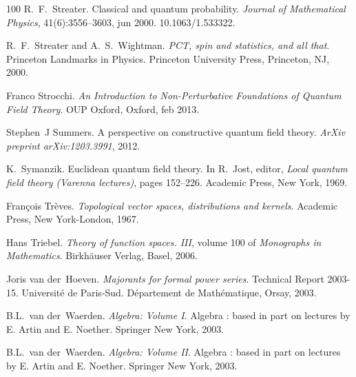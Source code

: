 \documentclass{article}
\newcommand{\tmtextit}[1]{{\itshape{#1}}}
\begin{document}
\begin{thebibliography}{100}
  R.~F.~Streater. {\newblock}Classical
  and quantum probability. {\newblock}\tmtextit{Journal of Mathematical
  Physics}, 41(6):3556--3603, jun 2000.
  {\newblock}\href{Https://doi.org/10.1063/1.533322}{}10.1063/1.533322.{\newblock}
  
  R.~F.~Streater  and  A.~S.~Wightman.
  {\newblock}\tmtextit{PCT, spin and statistics, and all that}.
  {\newblock}Princeton Landmarks in Physics. Princeton University Press,
  Princeton, NJ, 2000.{\newblock}
  
  Franco Strocchi.
  {\newblock}\tmtextit{An Introduction to Non-Perturbative Foundations of
  Quantum Field Theory}. {\newblock}OUP Oxford, Oxford, feb 2013.{\newblock}
  
  Stephen~J Summers. {\newblock}A
  perspective on constructive quantum field theory. {\newblock}\tmtextit{ArXiv
  preprint arXiv:1203.3991}, 2012.{\newblock}
  
  K.~Symanzik. {\newblock}Euclidean quantum field
  theory. {\newblock}In  R.~Jost, editor, \tmtextit{Local quantum field theory
  (Varenna lectures)},  pages  152--226. Academic Press, New York,
  1969.{\newblock}
  
  Fran{\c c}ois Tr{\`e}ves.
  {\newblock}\tmtextit{Topological vector spaces, distributions and kernels}.
  {\newblock}Academic Press, New York-London, 1967.{\newblock}
  
  Hans Triebel. {\newblock}\tmtextit{Theory of
  function spaces. III},  volume  100  of \tmtextit{Monographs in
  Mathematics}. {\newblock}Birkh{\"a}user Verlag, Basel, 2006.{\newblock}
  
  Joris van der~Hoeven. {\newblock}\tmtextit{Majorants
  for formal power series}. {\newblock}Technical Report 2003-15.
  Universit{\'e} de Paris-Sud. D{\'e}partement de Math{\'e}matique, Orsay,
  2003.{\newblock}
  
  B.L.~van der~Waerden.
  {\newblock}\tmtextit{Algebra: Volume I}. {\newblock}Algebra : based in part
  on lectures by E. Artin and E. Noether. Springer New York, 2003.{\newblock}
  
  B.L.~van der~Waerden.
  {\newblock}\tmtextit{Algebra: Volume II}. {\newblock}Algebra : based in part
  on lectures by E. Artin and E. Noether. Springer New York, 2003.{\newblock}
  

\end{thebibliography}
\end{document}
